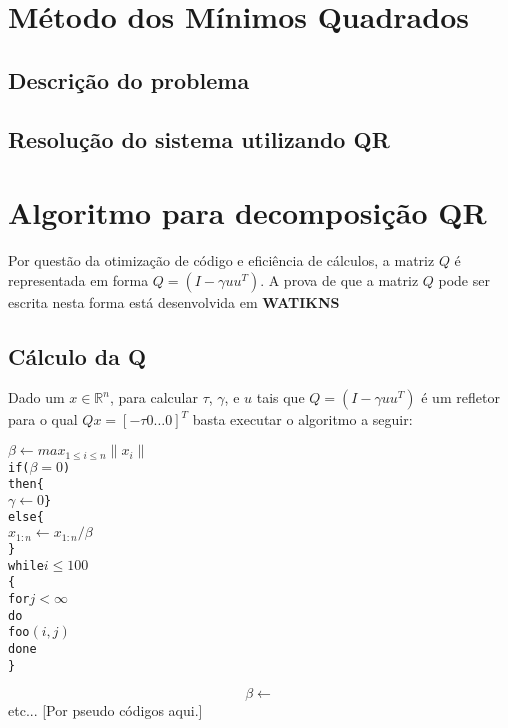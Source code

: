 \chapter{Método dos Mínimos Quadrados}

	\section{Descrição do problema}
	
	\section{Resolução do sistema utilizando QR}


\chapter{Algoritmo para decomposição QR}
Por questão da otimização de código e eficiência de cálculos, a matriz $Q$ é representada em forma $Q = (I - \gamma uu^T)$. A prova de que a matriz $Q$ pode ser escrita nesta forma está desenvolvida em \textbf{WATIKNS}%

\section{Cálculo da Q}
	Dado um $x \in \mathbb{R}^n$, para calcular $\tau$, $\gamma$, e $u$ tais que $Q = (I - \gamma uu^T)$ é um refletor para o qual $Qx = [-\tau 0 \ldots 0]^T$ basta executar o algoritmo a seguir:


\begin{alltt}
  \( \beta \leftarrow max_{1 \le i \le n} \|x_i\| \)
  if(\(\beta = 0\))
  then \{
  		\(\gamma \leftarrow 0\)\}
  else \{
  		\(x_{1:n} \leftarrow x_{1:n}/\beta\)
  	\}
  while \(i \leq 100\)
  \{
    for \(j < \infty\)
    do
      foo\((i,j)\)
    done
  \}
\end{alltt}

	\[\beta \leftarrow \]
	\[\]
etc... [Por pseudo códigos aqui.]